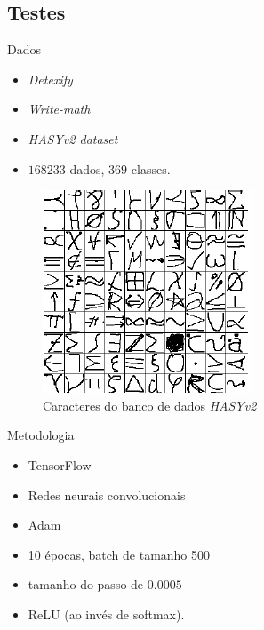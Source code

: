 \documentclass{beamer}
\begin{document}
    \subsection{Testes}
    \begin{frame}{Dados}
        \begin{itemize}
            \item \emph{Detexify}
            \item \emph{Write-math}
            \item \emph{HASYv2 dataset}
            \item $168233$ dados, $369$ classes.
        \end{itemize}
        \begin{figure}
            \centering
            \includegraphics[width=.45\textwidth,height=.45\textheight]{sampleshvsy2.png}
            \caption{Caracteres do banco de dados \emph{HASYv2}}
            \label{fig:samplehasy}
        \end{figure}
    \end{frame}

    \begin{frame}{Metodologia}
        \begin{itemize}
            \item TensorFlow
            \item Redes neurais convolucionais
            \item Adam
            \item 10 épocas, batch de tamanho 500
            \item tamanho do passo de $0.0005$
            \item ReLU (ao invés de softmax).
        \end{itemize}
    \end{frame}
\end{document}
